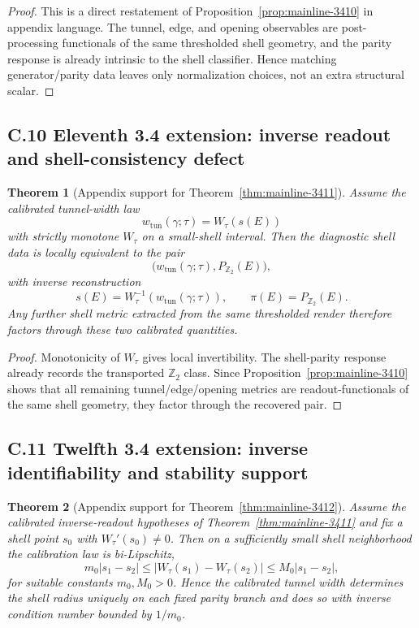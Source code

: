 \documentclass[12pt,a4paper]{article}
\newtheorem{theorem}{Theorem}[section]
\begin{document}
\begin{proof}
This is a direct restatement of Proposition~\ref{prop:mainline-3410} in appendix language. The tunnel, edge, and opening observables are post-processing functionals of the same thresholded shell geometry, and the parity response is already intrinsic to the shell classifier. Hence matching generator/parity data leaves only normalization choices, not an extra structural scalar.
\end{proof}


\subsection*{C.10 Eleventh 3.4 extension: inverse readout and shell-consistency defect}

\begin{theorem}[Appendix support for Theorem~\ref{thm:mainline-3411}]
\label{thm:appendix-3411}
Assume the calibrated tunnel-width law
\[
 w_{\mathrm{tun}}(\gamma;\tau)=W_\tau(s(E))
\]
with strictly monotone $W_\tau$ on a small-shell interval. Then the diagnostic shell data is locally equivalent to the pair
\[
 \bigl(w_{\mathrm{tun}}(\gamma;\tau),P_{\mathbb Z_2}(E)\bigr),
\]
with inverse reconstruction
\[
 s(E)=W_\tau^{-1}(w_{\mathrm{tun}}(\gamma;\tau)),
 \qquad
 \pi(E)=P_{\mathbb Z_2}(E).
\]
Any further shell metric extracted from the same thresholded render therefore factors through these two calibrated quantities.
\end{theorem}

\begin{proof}
Monotonicity of $W_\tau$ gives local invertibility. The shell-parity response already records the transported $\mathbb Z_2$ class. Since Proposition~\ref{prop:mainline-3410} shows that all remaining tunnel/edge/opening metrics are readout-functionals of the same shell geometry, they factor through the recovered pair.
\end{proof}


\subsection*{C.11 Twelfth 3.4 extension: inverse identifiability and stability support}

\begin{theorem}[Appendix support for Theorem~\ref{thm:mainline-3412}]
\label{thm:appendix-3412}
Assume the calibrated inverse-readout hypotheses of Theorem~\ref{thm:mainline-3411} and fix a shell point $s_0$ with $W_\tau'(s_0)\neq 0$. Then on a sufficiently small shell neighborhood the calibration law is bi-Lipschitz,
\[
 m_0|s_1-s_2|
 \le |W_\tau(s_1)-W_\tau(s_2)|
 \le M_0|s_1-s_2|,
\]
for suitable constants $m_0,M_0>0$. Hence the calibrated tunnel width determines the shell radius uniquely on each fixed parity branch and does so with inverse condition number bounded by $1/m_0$.
\end{theorem}
\end{document}
